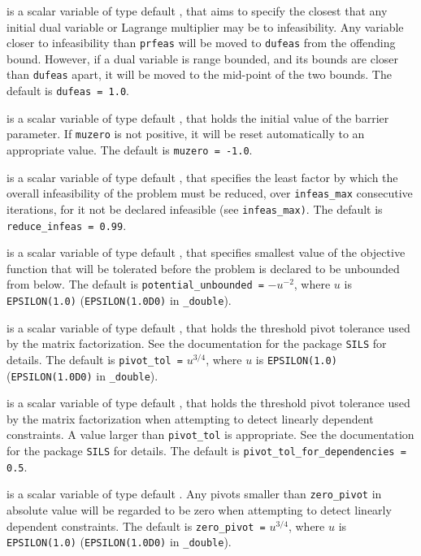 \begin{description}
 is a scalar variable of type default \realdp, that aims to specify
the closest that any initial dual variable or Lagrange multiplier may be to 
infeasibility. Any variable closer to infeasibility than {\tt prfeas} will be
moved to {\tt dufeas} from the offending bound. However, if a dual variable
is range bounded, and its bounds are closer than {\tt dufeas} apart, it will
be moved to the mid-point of the two bounds.
The default is {\tt dufeas = 1.0}.

  is a scalar variable of type default \realdp, that holds the
initial value of the barrier parameter. If {\tt muzero} is
not positive, it will be reset automatically to an appropriate value.
The default is {\tt muzero = -1.0}.

  is a scalar variable of type default 
\realdp, that specifies the
least factor by which the overall infeasibility of the problem must be reduced,
over {\tt infeas\_max} consecutive iterations, 
for it not be declared infeasible (see {\tt infeas\_max)}.
The default is {\tt reduce\_infeas = 0.99}.

  is a scalar variable of type default 
\realdp, that specifies smallest
value of the objective function that will be tolerated before the problem
is declared to be unbounded from below.
The default is {\tt potential\_u\-nbounded =} $-u^{-2}$,
where $u$ is {\tt EPSILON(1.0)} ({\tt EPSILON(1.0D0)} in 
{\tt \fullpackagename\_double}).

  is a scalar variable of type default 
\realdp, that holds the
threshold pivot tolerance used by the matrix factorization.  See 
the documentation for the package {\tt SILS} for details.
The default is {\tt pivot\_tol =} $u^{3/4}$,
where $u$ is {\tt EPSILON(1.0)} ({\tt EPSILON(1.0D0)} in 
{\tt \fullpackagename\_double}).

 is a scalar variable of type default 
\realdp, that holds the
threshold pivot  tolerance used by the matrix factorization when 
attempting to detect linearly dependent constraints. A value larger
than  {\tt pivot\_tol} is appropriate. See 
the documentation for the package {\tt SILS} for details.
The default is {\tt pivot\_tol\_for\_dependencies = 0.5}.

 is a scalar variable of type default \realdp.
Any pivots smaller than  {\tt zero\_pivot} in absolute value will be regarded 
to be zero when attempting to detect linearly dependent constraints. 
The default is {\tt zero\_pivot =} $u^{3/4}$,
where $u$ is {\tt EPSILON(1.0)} ({\tt EPSILON(1.0D0)} in 
{\tt \fullpackagename\_dou\-ble}).


\end{description}
